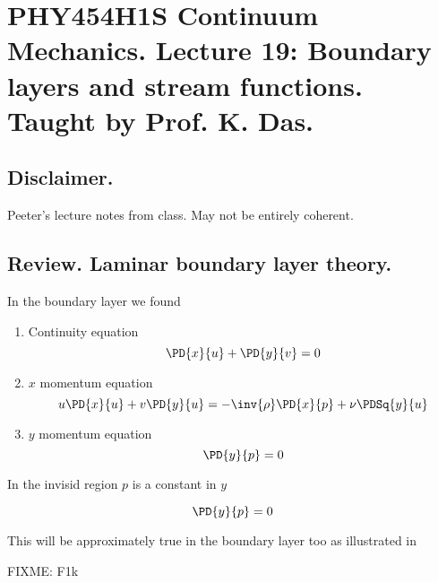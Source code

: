 
%

\chapter{PHY454H1S Continuum Mechanics.  Lecture 19: Boundary layers and stream functions.  Taught by Prof. K. Das.}
\label{chap:continuumL19}
{}
\date{Mar 23, 2012}

\beginArtWithToc

\section{Disclaimer.}

Peeter's lecture notes from class.  May not be entirely coherent.

\section{Review.  Laminar boundary layer theory.}

In the boundary layer we found
\begin{enumerate}
\item Continuity equation
\begin{equation}\label{eqn:continuumL19:n}
\PD{x}{u} + \PD{y}{v} = 0
\end{equation}
\item $x$ momentum equation
\begin{equation}\label{eqn:continuumL19:n}
u \PD{x}{u} + v \PD{y}{u} = - \inv{\rho} \PD{x}{p} + \nu \PDSq{y}{u}
\end{equation}
\item $y$ momentum equation
\begin{equation}\label{eqn:continuumL19:n}
\PD{y}{p} = 0
\end{equation}
\end{enumerate}

In the invisid region $p$ is a constant in $y$

\begin{equation}\label{eqn:continuumL19:n}
\PD{y}{p} = 0
\end{equation}

This will be approximately true in the boundary layer too as illustrated in

FIXME: F1k


